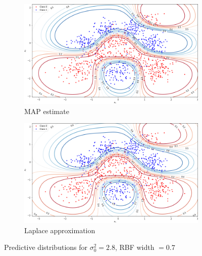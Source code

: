 \documentclass[a4paper]{article}
\begin{document}
     \begin{figure}[h]
         \begin{subfigure}{0.45\textwidth}
            \centering
            \includegraphics[width=\textwidth]{plots/bayesian_logistic_classification/predictive_distribution_map_width_0.7_prior_variance_2.8}
            \caption{MAP estimate}
            \label{fig:predictive-distribution-optimised-map}
         \end{subfigure}
         \hfill
    \begin{subfigure}{0.45\textwidth}
            \centering
            \includegraphics[width=\textwidth]{plots/bayesian_logistic_classification/predictive_distribution_laplace_width_0.7_prior_variance_2.8}
            \caption{Laplace approximation}
            \label{fig:predictive-distribution-optimised-laplace}
         \end{subfigure}
         \caption{Predictive distributions for $\sigma_0^2 = 2.8$, RBF width $= 0.7$}
         \label{fig:predictive-distribution-optimised}
    \end{figure}
\end{document}
